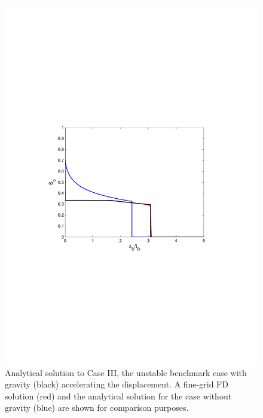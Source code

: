 \begin{figure}[h]
\vspace{-1cm}
\centering
\includegraphics[width=15.0cm,height=20.cm]{./figures/BL_gravity_down}
\vspace{-5.5cm}
\caption{Analytical solution to Case III, the unstable benchmark case with gravity (black) accelerating the displacement.  A fine-grid FD solution (red) and the analytical solution for the case without gravity (blue) are shown for comparison purposes.} 
\label{fig:BL_grav_down}
\end{figure}

